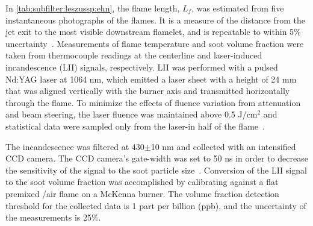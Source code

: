 In \cref{tab:subfilter:leszussp:ehn}, the flame length, $L_f$, was estimated from five instantaneous photographs of the flames. It is a measure of the distance from the jet exit to the most visible downstream flamelet, and is repeatable to within 5\% uncertainty~\cite{mahmoud2017}. Measurements of flame temperature and soot volume fraction were taken from thermocouple readings at the centerline and laser-induced incandescence (LII) signals, respectively. LII was performed with a pulsed Nd:YAG laser at 1064 nm, which emitted a laser sheet with a height of 24 mm that was aligned vertically with the burner axis and transmitted horizontally through the flame. To minimize the effects of fluence variation from attenuation and beam steering, the laser fluence was maintained above 0.5 J/cm$^2$ and statistical data were sampled only from the laser-in half of the flame~\cite{mahmoud2017,sun2015}.

The incandescence was filtered at 430$\pm$10 nm and collected with an intensified CCD camera. The CCD camera's gate-width was set to 50 ns in order to decrease the sensitivity of the signal to the soot particle size~\cite{vanderwal1996,mahmoud2017}. Conversion of the LII signal to the soot volume fraction was accomplished by calibrating against a flat premixed /air flame on a McKenna burner. The volume fraction detection threshold for the collected data is 1 part per billion (ppb), and the uncertainty of the measurements is 25\%.

